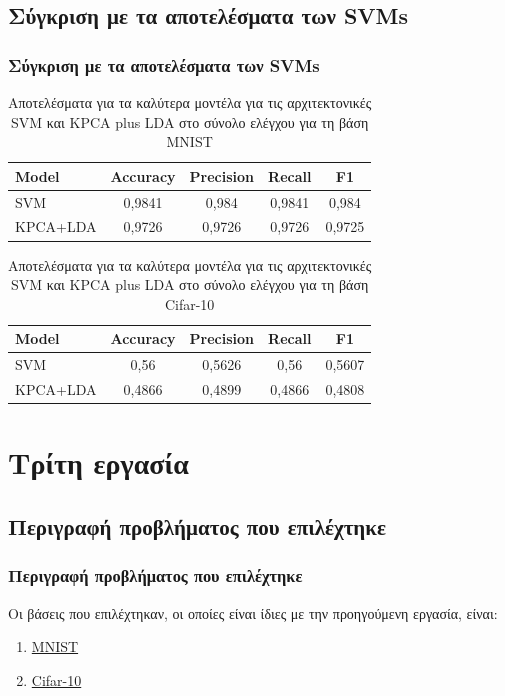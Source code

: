 \documentclass{beamer}
\begin{document}
\subsection{Σύγκριση με τα αποτελέσματα των SVMs}

\begin{frame}
\frametitle{Σύγκριση με τα αποτελέσματα των SVMs}

\begin{table}[H]
\centering
\begin{tabular}{|l|c|c|c|c|}
\hline
\textbf{Model} & \textbf{Accuracy} & \textbf{Precision} & \textbf{Recall} & \textbf{F1}\\ \hline
SVM & 0,9841 & 0,984 & 0,9841 & 0,984\\ \hline
KPCA+LDA & 0,9726 & 0,9726 & 0,9726 & 0,9725 \\ \hline
\end{tabular}
\caption{Αποτελέσματα για τα καλύτερα μοντέλα για τις αρχιτεκτονικές SVM και
    KPCA plus LDA στο σύνολο ελέγχου για τη βάση MNIST}
\label{tab:mnist_svm_kpca}
\end{table}

\begin{table}[H]
\centering
\begin{tabular}{|l|c|c|c|c|}
\hline
\textbf{Model} & \textbf{Accuracy} & \textbf{Precision} & \textbf{Recall} & \textbf{F1}\\ \hline
SVM & 0,56 & 0,5626 & 0,56 & 0,5607\\ \hline
KPCA+LDA & 0,4866 & 0,4899 & 0,4866 & 0,4808\\ \hline
\end{tabular}
\caption{Αποτελέσματα για τα καλύτερα μοντέλα για τις αρχιτεκτονικές SVM και
    KPCA plus LDA στο σύνολο ελέγχου για τη βάση Cifar-10}
\label{tab:cifar_svm_kpca}
\end{table}

\end{frame}

\section{Τρίτη εργασία}

\subsection{Περιγραφή προβλήματος που επιλέχτηκε}

\begin{frame}
\frametitle{Περιγραφή προβλήματος που επιλέχτηκε}

Οι βάσεις που επιλέχτηκαν, οι οποίες είναι ίδιες με την προηγούμενη εργασία,
είναι:

\begin{enumerate}
\item \href{http://yann.lecun.com/exdb/mnist/}{MNIST}
\item \href{https://www.cs.toronto.edu/~kriz/cifar.html}{Cifar-10}
\end{enumerate}

\end{frame}
\end{document}
